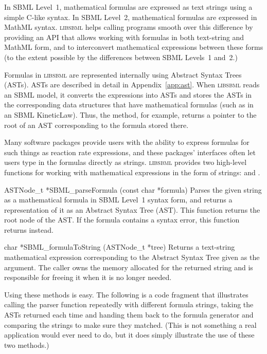 \documentclass{sbmlmanual}
\newcommand{\libsbml}{\textsc{libsbml}}
\begin{document}
In SBML Level~1, mathematical formulas are expressed as text strings using
a simple C-like syntax.  In SBML Level~2, mathematical formulas are
expressed in MathML syntax.  \libsbml{} helps calling programs smooth over
this difference by providing an API that allows working with formulas in
both text-string and MathML form, and to interconvert mathematical
expressions between these forms (to the extent possible by the differences
between SBML Levels~1 and~2.)

Formulas in \libsbml{} are represented internally using Abstract Syntax
Trees (ASTs).  ASTs are described in detail in Appendix~\ref{app:ast}.
When \libsbml{} reads an SBML model, it converts the expressions into ASTs
and stores the ASTs in the corresponding data structures that have
mathematical formulas (such as in an SBML KineticLaw).  Thus, the
 method, for example, returns a pointer to
the root of an AST corresponding to the formula stored there.

Many software packages provide users with the ability to express formulas
for such things as reaction rate expressions, and these packages'
interfaces often let users type in the formulas directly as strings.
\libsbml{} provides two high-level functions for working with mathematical
expressions in the form of strings:  and
.

\begin{methoddef}{ASTNode\_t *SBML\_parseFormula (const char *formula)}
  Parses the given string as a mathematical formula in SBML Level~1 syntax
  form, and returns a representation of it as an Abstract Syntax Tree
  (AST).  This function returns the root node of the AST.  If the formula
  contains a syntax error, this function returns  instead.
\end{methoddef}

\begin{methoddef}{char *SBML\_formulaToString (ASTNode\_t *tree)}
  Returns a text-string mathematical expression corresponding to the
  Abstract Syntax Tree given as the argument.  The caller owns the memory
  allocated for the returned string and is responsible for freeing it when
  it is no longer needed.
\end{methoddef}

Using these methods is easy.  The following is a code fragment that
illustrates calling the parser function repeatedly with different formula
strings, taking the ASTs returned each time and handing them back to the
formula generator and comparing the strings to make sure they matched.
(This is not something a real application would ever need to do, but it
does simply illustrate the use of these two methods.)
\end{document}
